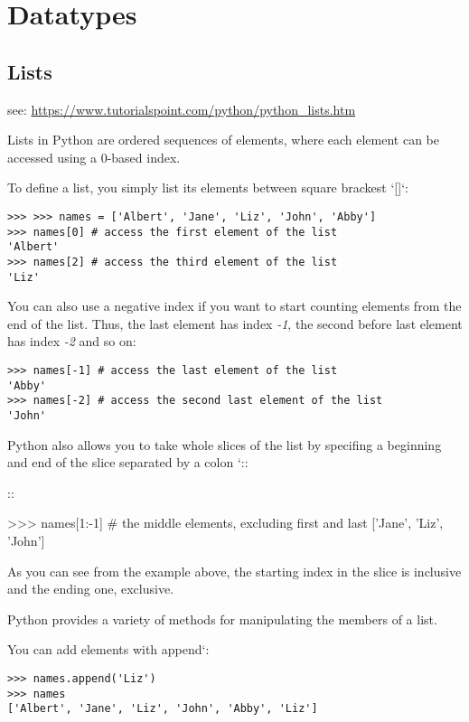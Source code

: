 \section{Datatypes}\label{datatypes}

\subsection{Lists}\label{lists}

see: \url{https://www.tutorialspoint.com/python/python_lists.htm}

Lists in Python are ordered sequences of elements, where each element
can be accessed using a 0-based index.

To define a list, you simply list its elements between square brackest
`{[}{]}`:

\begin{verbatim}
>>> >>> names = ['Albert', 'Jane', 'Liz', 'John', 'Abby']
>>> names[0] # access the first element of the list
'Albert'
>>> names[2] # access the third element of the list
'Liz'
\end{verbatim}

You can also use a negative index if you want to start counting elements
from the end of the list. Thus, the last element has index \emph{-1},
the second before last element has index \emph{-2} and so on:

\begin{verbatim}
>>> names[-1] # access the last element of the list
'Abby'
>>> names[-2] # access the second last element of the list
'John'
\end{verbatim}

Python also allows you to take whole slices of the list by specifing a
beginning and end of the slice separated by a colon `::

::

  \textgreater{}\textgreater{}\textgreater{} names{[}1:-1{]} \# the middle elements, excluding first and last
  {[}'Jane', 'Liz', 'John'{]}

As you can see from the example above, the starting index in the slice
is inclusive and the ending one, exclusive.

Python provides a variety of methods for manipulating the members of a
list.

You can add elements with append`:

\begin{verbatim}
>>> names.append('Liz')
>>> names
['Albert', 'Jane', 'Liz', 'John', 'Abby', 'Liz']
\end{verbatim}

